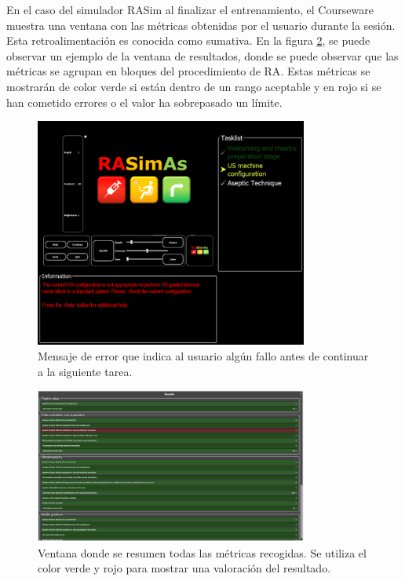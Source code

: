 En el caso del simulador \ac{RASim} al finalizar el entrenamiento, el \ac{Courseware} muestra una ventana con las métricas obtenidas por el usuario durante la sesión. Esta retroalimentación es conocida como sumativa. En la figura \ref{fig:resultui}, se puede observar un ejemplo de la ventana de resultados, donde se puede observar que las métricas se agrupan en bloques del procedimiento de \ac{RA}. Estas métricas se mostrarán de color verde si están dentro de un rango aceptable y en rojo si se han cometido errores o el valor ha sobrepasado un límite.

\begin{figure}[ht]
    \centering
    \includegraphics[width=0.8\textwidth]{IMG/errorruntime.png}
    \caption{Mensaje de error que indica al usuario algún fallo antes de continuar a la siguiente tarea.}
    \label{fig:errorrun}
\end{figure}
\begin{figure}[ht]
    \centering
    \includegraphics[width=0.8\textwidth]{IMG/resultui.PNG}
    \caption{Ventana donde se resumen todas las métricas recogidas. Se utiliza el color verde y rojo para mostrar una valoración del resultado.}
    \label{fig:resultui}
\end{figure}




